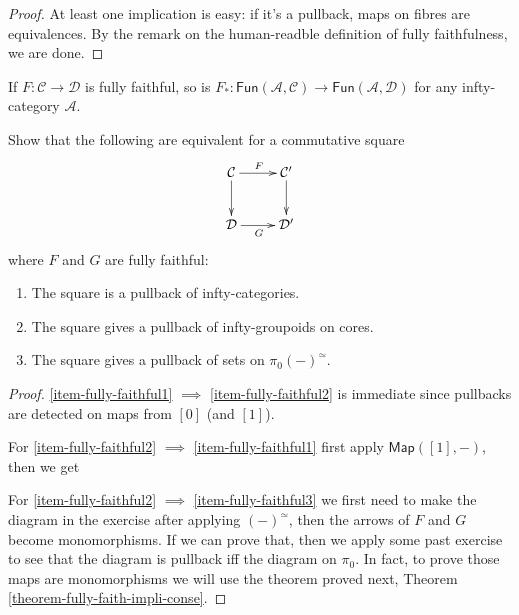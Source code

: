 \begin{proof}
At least one implication is easy:
if it's a pullback,
maps on fibres are equivalences.
By the remark on the human-readble
definition of fully faithfulness, we are
done.
\end{proof}

\begin{lemma}
\label{lemma-fully-faith-prese-fun}
If $F:\mathcal{C} \to \mathcal{D}$ is fully
faithful,
so is
$F_*:
\mathsf{Fun}(\mathcal{A},\mathcal{C})
\to\mathsf{Fun}(\mathcal{A},\mathcal{D})$
for any infty-category $\mathcal{A}$.
\end{lemma}

\begin{exercise}
\label{exercise-chara-pullb-fully-faith}
Show that the following are equivalent for a
commutative square
$$
\xymatrix{
\mathcal{C}\ar[r]^F\ar[d]&\mathcal{C}'\ar[d]
\\
\mathcal{D}\ar[r]_G&\mathcal{D}'
}
$$
where $F$ and $G$ are fully faithful:
\begin{enumerate}
\item The square is a pullback of
infty-categories.
\label{item-fully-faithful1}

\item The square gives a pullback of
infty-groupoids on cores.
\label{item-fully-faithful2}

\item The square gives a pullback of sets on
$\pi_0(-)^\simeq$.
\label{item-fully-faithful3}
\end{enumerate}
\end{exercise}

\begin{proof}
\ref{item-fully-faithful1} $\implies$
\ref{item-fully-faithful2}
is immediate since pullbacks are detected on
maps from $[0]$
(and $[1]$).

For \ref{item-fully-faithful2} $\implies$
\ref{item-fully-faithful1}
first apply $\mathsf{Map}([1],-)$, then we
get

For \ref{item-fully-faithful2} $\implies$
\ref{item-fully-faithful3}
we first need to make the diagram in the
exercise
after applying $(-)^{\simeq}$, then
the arrows of $F$ and $G$ become
monomorphisms.
If we can prove that, then
we apply some past exercise to see that
the diagram is pullback iff the diagram on
$\pi_0$.
In fact, to prove those maps are
monomorphisms
we will use the theorem proved next,
Theorem
\ref{theorem-fully-faith-impli-conse}.
\end{proof}

